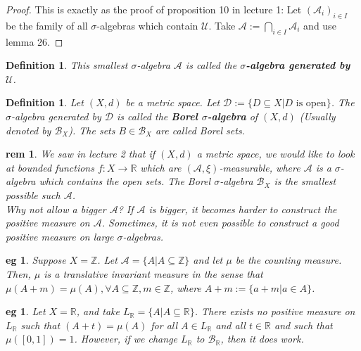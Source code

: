 \documentclass[letterpaper, 12pt]{article}
\newcommand{\fin}{\qquad \quad \hfill \framebox[1.75mm][l]{\,}}
\newcommand{\cU}{\mathcal{U}}
\newcommand{\cB}{\mathcal{B}}
\newcommand{\bR}{\mathbb{R}}
\newcommand{\bZ}{\mathbb{Z}}
\newcommand{\sA}{\mathcal{A}}
\theoremstyle{stdthm}
\theoremstyle{stddef}
\newtheorem{defn}[thm]{Definition}
\newtheorem{rem}[thm]{rem} %
\newtheorem{eg}[thm]{eg} %
\theoremstyle{stdnonum}
\theoremstyle{stdqands}
\theoremstyle{stdbold}
\begin{document}
\begin{proof}
This is exactly as the proof of proposition 10 %
in lecture 1: Let $(\sA_i)_{i \in I}$ be the family of all $\sigma$-algebras which contain $\cU$. Take $\sA:=\bigcap_{i \in I} \sA_i$ and use lemma 26. %
\end{proof}

\begin{defn}
This smallest $\sigma$-algebra $\sA$ is called the {\bf $\sigma$-algebra generated by $\cU$}. 
\end{defn}

\begin{defn}
Let $(X,d)$ be a metric space. Let $\mathcal{D} := \{D \subseteq X|D \text{ is open}\}$. The $\sigma$-algebra generated by $\mathcal{D}$ is called the {\bf Borel %
$\sigma$-algebra }of $(X,d)$ (Usually denoted by $\cB_X$). The sets $B \in \cB_X$ are called Borel sets. 
\end{defn}

\begin{rem}
We saw in lecture 2 that if $(X,d)$ a metric space, we would like to look at bounded functions $f:X\rightarrow \bR$ which are $(\sA,\xi)$-measurable, where $\sA$ is a $\sigma$-algebra which contains the open sets.  The Borel $\sigma$-algebra $\cB_X$ is the smallest possible such $\sA$.  \\

\noindent Why not allow a bigger $\sA$? If $\sA$ is bigger, it becomes harder to construct the positive measure on $\sA$. Sometimes, it is not even possible to construct a good positive measure on large $\sigma$-algebras. 
\end{rem}

\begin{eg}
Suppose $X = \bZ$. Let $\sA = \{A | A \subseteq \bZ\}$ and let $\mu$ be the counting measure. Then, $\mu$ is a translative invariant measure in the sense that $\mu(A+m) = \mu(A), \forall A\subseteq \bZ, m \in \bZ$, where $A+m := \{a+m|a\in A\}$. 
\end{eg}

\begin{eg}
Let $X = \bR$, and take $L_{\bR} = \{A|A\subseteq \bR\}$. There exists no positive measure on $L_{\bR}$ such that $(A+t) = \mu(A)$ for all $A \in L_{\bR}$ and all $t\in \bR$ and such that $\mu([0,1])=1$. However, if we change $L_{\bR}$ to $\cB_{\bR}$, then it does work. 
\end{eg}
\end{document}
